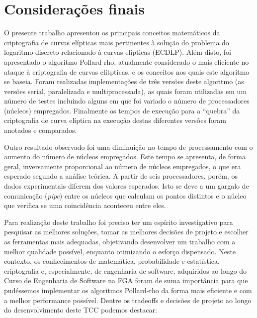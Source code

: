 \chapter{Considerações finais}
O presente trabalho apresentou os principais conceitos matemáticos da criptografia de curvas elípticas mais pertinentes à solução do problema do logaritmo discreto relacionado à curvas elípticas (ECDLP). Além disto, foi apresentado o algoritmo Pollard-rho, atualmente considerado o mais eficiente no ataque à criptografia de curvas elítpticas, e os conceitos nos quais este algoritmo se baseia. Foram realizadas implementações de três versões deste algoritmo (as versões serial, paralelizada e multiprocessada), as quais foram utilizadas em um número de testes incluindo alguns em que foi variado o número de processadores (núcleos) empregados. Finalmente os tempos de execução para a ``quebra'' da criptografia de curva elíptica na execução destas diferentes versões foram anotados e comparados.

Outro resultado observado foi uma diminuição no tempo de processamento com o aumento do número de núcleos empregados. Este tempo se apresenta, de forma geral, inversamente proporcional ao número de núcleos empregados, o que era esperado segundo a análise teórica. A partir de seis processadores, porém, os dados experimentais diferem dos valores esperados. Isto se deve a um gargalo de comunicação (\textit{pipe}) entre os núcleos que calculam os pontos distintos e o núcleo que verifica se uma coincidência aconteceu entre eles.

Para realização deste trabalho foi preciso ter um espírito investigativo para pesquisar as melhores soluções, tomar as melhores decisões de projeto e escolher as ferramentas mais adequadas, objetivando desenvolver um trabalho com a melhor qualidade possível, enquanto otimizando o esforço dispensado. Neste contexto, os conhecimentos de matemática, probabilidade e estatística, criptografia e, especialmente, de engenharia de software, adquiridos ao longo do Curso de Engenharia de Software na FGA foram de suma importância para que pudéssemos implementar os algoritmos Pollard-rho da forma mais eficiente e com a melhor performance possível. Dentre os tradeoffs e decisões de projeto ao longo do desenvolvimento deste TCC podemos destacar:


